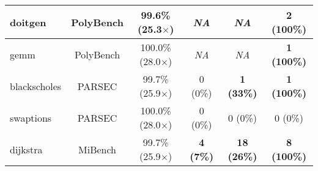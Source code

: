 \begin{tabular}{|l|c|c||c|c|c|}
\hline
doitgen   & PolyBench & 99.6\% (25.3$\times$) & \textit{NA} & \textit{NA} & \textbf{2 (100\%)} \\ %
\hline
gemm     & PolyBench  & 100.0\% (28.0$\times$) & \textit{NA} & \textit{NA} & \textbf{1 (100\%)} \\ %
\hline
blackscholes & PARSEC & 99.7\% (25.9$\times$) & 0 (0\%) & \textbf{1 (33\%)} & \textbf{1 (100\%)} \\ %
\hline
swaptions & PARSEC & 100.0\% (28.0$\times$)  & 0 (0\%) & 0 (0\%) & 0 (0\%) \\ %
\hline
dijkstra & MiBench  & 99.7\% (25.9$\times$) & \textbf{4 (7\%)} & \textbf{18 (26\%)} & \textbf{8 (100\%)} \\ %
\hline
\end{tabular}